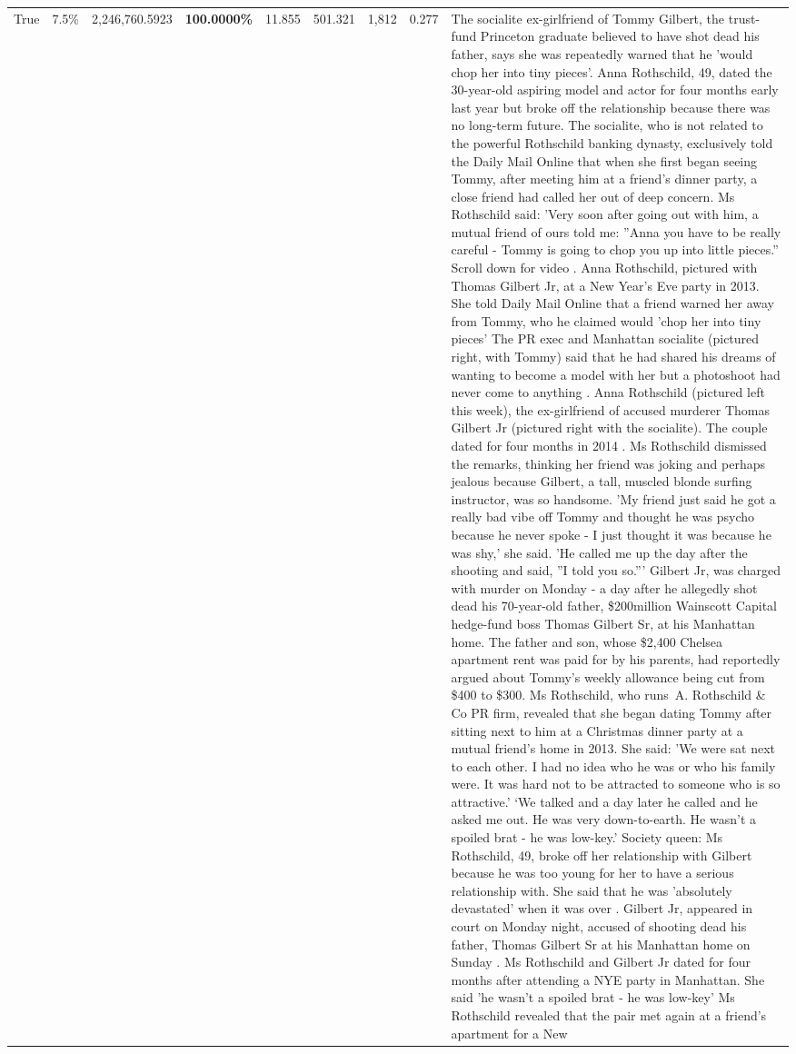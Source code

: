 \begin{table}[H]
\begin{tabular}{lllrlllll}
True & 7.5\% & 2,246,760.5923 & \bfseries \color{red} 100.0000\% & 11.855 & 501.321 & 1,812 & 0.277 & The socialite ex-girlfriend of Tommy Gilbert, the trust-fund Princeton graduate believed to have shot dead his father, says she was repeatedly warned that he 'would chop her into tiny pieces'. Anna Rothschild, 49, dated the 30-year-old aspiring model and actor for four months early last year but broke off the relationship because there was no long-term future. The socialite, who is not related to the powerful Rothschild banking dynasty, exclusively told the Daily Mail Online that when she first began seeing Tommy, after meeting him at a friend's dinner party, a close friend had called her out of deep concern. Ms Rothschild said: 'Very soon after going out with him, a mutual friend of ours told me: ''Anna you have to be really careful - Tommy is going to chop you up into little pieces.'' Scroll down for video . Anna Rothschild, pictured with Thomas Gilbert Jr, at a New Year's Eve party in 2013. She told Daily Mail Online that a friend warned her away from Tommy, who he claimed would 'chop her into tiny pieces' The PR exec and Manhattan socialite (pictured right, with Tommy) said that he had shared his dreams of wanting to become a model with her but a photoshoot had never come to anything . Anna Rothschild (pictured left this week), the ex-girlfriend of accused murderer Thomas Gilbert Jr (pictured right with the socialite). The couple dated for four months in 2014 . Ms Rothschild dismissed the remarks, thinking her friend was joking and perhaps jealous because Gilbert, a tall, muscled blonde surfing instructor, was so handsome. 'My friend just said he got a really bad vibe off Tommy and thought he was psycho because he never spoke - I just thought it was because he was shy,' she said. 'He called me up the day after the shooting and said, ''I told you so.''' Gilbert Jr, was charged with murder on Monday - a day after he allegedly shot dead his 70-year-old father, \$200million Wainscott Capital hedge-fund boss Thomas Gilbert Sr, at his Manhattan home. The father and son, whose \$2,400 Chelsea apartment rent was paid for by his parents, had reportedly argued about Tommy's weekly allowance being cut from \$400 to \$300. Ms Rothschild, who runs A. Rothschild \& Co PR firm, revealed that she began dating Tommy after sitting next to him at a Christmas dinner party at a mutual friend's home in 2013. She said: 'We were sat next to each other. I had no idea who he was or who his family were. It was hard not to be attracted to someone who is so attractive.' ‘We talked and a day later he called and he asked me out. He was very down-to-earth. He wasn’t a spoiled brat - he was low-key.’ Society queen: Ms Rothschild, 49, broke off her relationship with Gilbert because he was too young for her to have a serious relationship with. She said that he was 'absolutely devastated' when it was over . Gilbert Jr, appeared in court on Monday night, accused of shooting dead his father, Thomas Gilbert Sr at his Manhattan home on Sunday . Ms Rothschild and Gilbert Jr dated for four months after attending a NYE party in Manhattan. She said 'he wasn't a spoiled brat - he was low-key' Ms Rothschild revealed that the pair met again at a friend’s apartment for a New 
\end{tabular}
\end{table}
